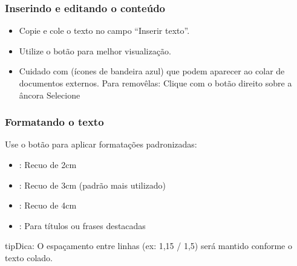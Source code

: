 \documentclass[letterpaper,10pt,brazil]{sphinxmanual}
\begin{document}
\subsubsection{Inserindo e editando o conteúdo}
\label{\detokenize{projud_48_criandomodelo:inserindo-e-editando-o-conteudo}}\begin{itemize}
\item {} 
\sphinxAtStartPar
Copie e cole o texto no campo “Inserir texto”.

\item {} 
\sphinxAtStartPar
Utilize o botão  para melhor visualização.

\item {} 
\sphinxAtStartPar
Cuidado com  (ícones de bandeira azul) que podem aparecer ao colar de documentos externos. Para removê\sphinxhyphen{}las:
\sphinxhyphen{} Clique com o botão direito sobre a âncora
\sphinxhyphen{} Selecione 

\end{itemize}


\subsubsection{Formatando o texto}
\label{\detokenize{projud_48_criandomodelo:formatando-o-texto}}
\sphinxAtStartPar
Use o botão  para aplicar formatações padronizadas:
\begin{itemize}
\item {} 
\sphinxAtStartPar
{}: Recuo de 2cm

\item {} 
\sphinxAtStartPar
{}: Recuo de 3cm (padrão mais utilizado)

\item {} 
\sphinxAtStartPar
{}: Recuo de 4cm

\item {} 
\sphinxAtStartPar
{}: Para títulos ou frases destacadas

\end{itemize}

\begin{sphinxadmonition}{tip}{Dica:}
\sphinxAtStartPar
O espaçamento entre linhas (ex: 1,15 / 1,5) será mantido conforme o texto colado.
\end{sphinxadmonition}
\end{document}
